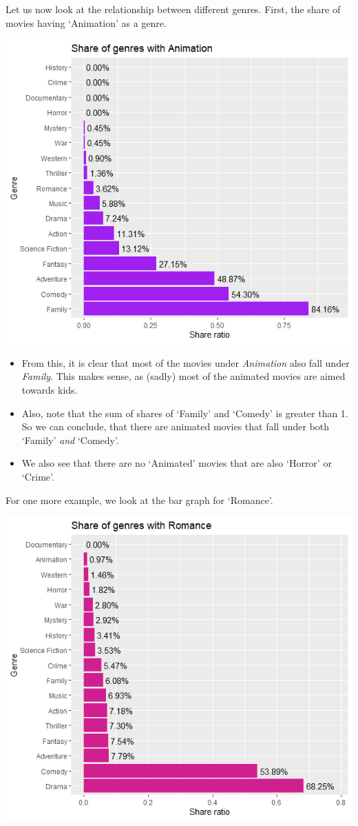 \documentclass[10pt]{article}
\begin{document}
\begin{multicols}{2}
Let us now look at the relationship between different genres.
First, the share of movies having `Animation' as a genre.

\includegraphics[scale = 0.5]{share_genres_animation.png}
\begin{itemize}
    \item From this, it is clear that most of the movies under \emph{Animation} also fall under \emph{Family}. This makes sense, 
    as (sadly) most of the animated movies are aimed towards kids. 
    \item Also, note that the sum of shares of `Family' and `Comedy' is greater than 1. 
    So we can conclude, 
    that there are animated movies that fall under both `Family' \emph{and} `Comedy'.
    \item We also see that there are no `Animated' movies that are also `Horror' or `Crime'.
\end{itemize}

For one more example, we look at the bar graph for `Romance'.

\includegraphics[scale=0.5]{share_genres_romance.png}


\end{multicols}
\end{document}

